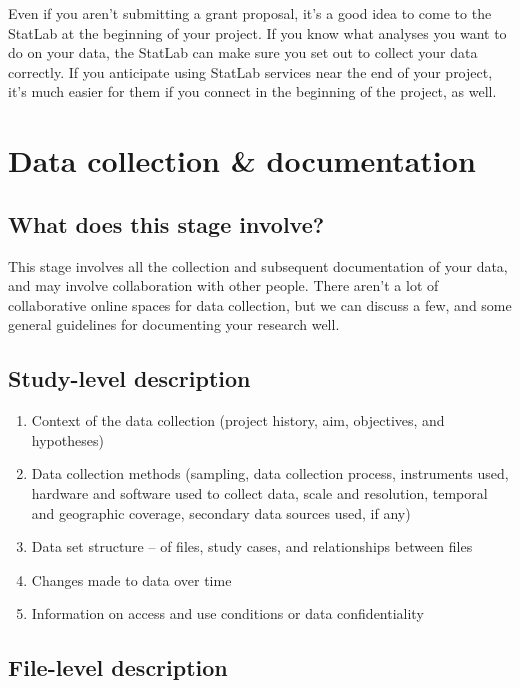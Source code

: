 \documentclass{tufte-handout}
\begin{document}
Even if you aren't submitting a grant proposal, it's a good idea to come
to the StatLab at the beginning of your project. If you know what
analyses you want to do on your data, the StatLab can make sure you set
out to collect your data correctly. If you anticipate using StatLab
services near the end of your project, it's much easier for them if you
connect in the beginning of the project, as well.

\section{Data collection \&
documentation}\label{data-collection-documentation}

\subsection{What does this stage
involve?}\label{what-does-this-stage-involve-1}

This stage involves all the collection and subsequent documentation of
your data, and may involve collaboration with other people. There aren't
a lot of collaborative online spaces for data collection, but we can
discuss a few, and some general guidelines for documenting your research
well.

\subsection{Study-level description}\label{study-level-description}

\begin{enumerate}
\def\labelenumi{\arabic{enumi}.}
\itemsep1pt\parskip0pt
\item
  Context of the data collection (project history, aim, objectives, and
  hypotheses)
\item
  Data collection methods (sampling, data collection process,
  instruments used, hardware and software used to collect data, scale
  and resolution, temporal and geographic coverage, secondary data
  sources used, if any)
\item
  Data set structure -- of files, study cases, and relationships between
  files
\item
  Changes made to data over time
\item
  Information on access and use conditions or data confidentiality
\end{enumerate}

\subsection{File-level description}\label{file-level-description}
\end{document}
